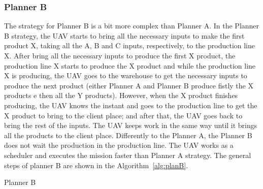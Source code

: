 \documentclass[conference,harvard,brazil,english]{sbatex}
\begin{document}
\subsubsection{Planner B}

The strategy for Planner B is a bit more complex than Planner A. In the Planner B strategy, the UAV starts to bring all the necessary inputs to make the first product X, taking all the A, B and C inputs, respectively, to the production line X. After bring all the necessary inputs to produce the first X product, the production line X starts to produce the X product and while the production line X is producing, the UAV goes to the warehouse to get the necessary inputs to produce the next product (either Planner A and Planner B produce fistly the X products e then all the Y products). However, when the X product finishes producing, the UAV knows the instant and goes to the production line to get the X product to bring to the client place; and after that, the UAV goes back to bring the rest of the inputs. The UAV keeps work in the same way until it brings all the products to the client place. Differently to the Planner A, the Planner B does not wait the production in the production line. The UAV works as a scheduler and executes the mission faster than Planner A strategy. The general steps of planner B are shown in the Algorithm~\ref{alg:planB}.
%
\begin{algorithm}[ht]
\footnotesize
{}
\captionsetup{list=no}
\caption{Planner B}\label{alg:planB}
\end{algorithm}
\end{document}
